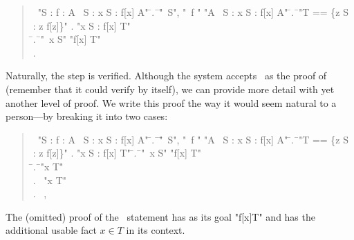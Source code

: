 \documentclass[a4paper]{easychair}
\begin{document}
\begin{quote} \small
  \begin{tabbing}
    \THEOREM\ "\forall S : \forall f \in [S -> \SUBSET\ S] : \exists A \in \SUBSET\ S : \forall x \in S : f[x] \neq A" \kill
    \PROOF \kill
    \LSP \= .\ \= \ASSUME \= "\NEW\ S", \kill
         \>        \>         \> "\NEW\ f \in [S -> \SUBSET\ S]" \kill
         \>        \> \PROVE "\exists A \in \SUBSET\ S : \forall x \in S : f[x] \neq A" \kill
         \>        \> \PROOF \kill
         \>   \hspace{1em} \= .\ \= \DEFINE "T == \{z \in S : z \notin f[z]\}" \kill
         \>        \> .  \> "\forall x \in S : f[x] \neq T" \\
         \>        \> \hspace{1em} \= .\ \= \ASSUME "\NEW\ x \in S" \PROVE "f[x] \neq T" \\
         \>        \>        \> .\ \> \QED \BY {}
  \end{tabbing}
\end{quote}
Naturally, the \QED step is verified.  Although the system accepts
\OBVIOUS\ as the proof of  (remember that it could verify  by
itself), we can provide more detail with yet another level
of proof.  We write this proof the way it would seem natural to a
person---by breaking it into two cases:
\begin{quote} \small
  \begin{tabbing}
    \THEOREM\ "\forall S : \forall f \in [S -> \SUBSET\ S] : \exists A \in \SUBSET\ S : \forall x \in S : f[x] \neq A" \kill
    \PROOF \kill
    \LSP \= .\ \= \ASSUME \= "\NEW\ S", \kill
         \>        \>         \> "\NEW\ f \in [S -> \SUBSET\ S]" \kill
         \>        \> \PROVE "\exists A \in \SUBSET\ S : \forall x \in S : f[x] \neq A" \kill
         \>        \> \PROOF \kill
         \> \hspace{1em} \= .\ \= \DEFINE "T == \{z \in S : z \notin f[z]\}" \kill
         \>        \> .  \> "\forall x \in S : f[x] \neq T" \kill
         \>        \>  \hspace{1em} \= .\ \= \ASSUME "\NEW\ x \in S" \PROVE "f[x] \neq T" \\
         \>        \>        \> \hspace{1em} \= .\ \= \CASE "x \in T" \\
         \>        \>        \>        \> .\ \> \CASE "x \notin T" \\
         \>        \>        \>        \> .\ \> \QED \BY {}, 
  \end{tabbing}
\end{quote}
The (omitted) proof of the \CASE\ statement  has as its goal
"f[x]\neq T" and has the additional usable fact $x\in T$ in its context.
\end{document}
